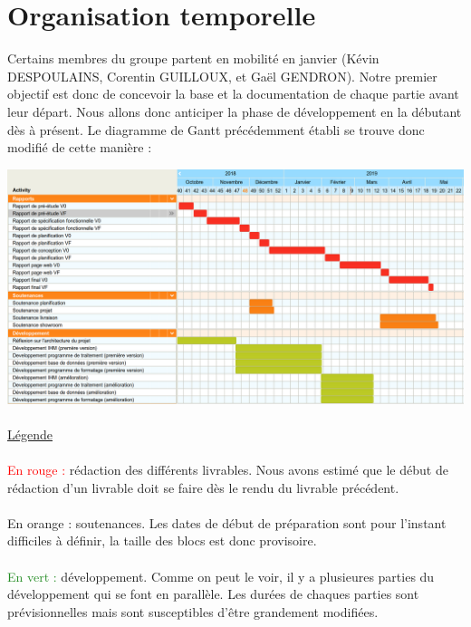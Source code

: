 \newpage

\section{Organisation temporelle}

Certains membres du groupe partent en mobilité en janvier (Kévin DESPOULAINS,
Corentin GUILLOUX, et Gaël GENDRON). Notre premier objectif est donc de
concevoir la base et la documentation de chaque partie avant leur départ.
Nous allons donc anticiper la phase de développement en la débutant dès à
présent. Le diagramme de Gantt précédemment établi se trouve donc modifié de
cette manière :

\begin{mdframed}[frametitle={Figure 17 : Estimation de la planification des tâches}, innerbottommargin=10]
\begin{center}
\includegraphics[scale=0.85]{gantt.png}
\end{center}
\end{mdframed}

\paragraph{}
\underline{Légende}

\paragraph{}
\textcolor{red}{En rouge : } rédaction des différents livrables. Nous avons estimé que le début de rédaction d’un livrable doit se faire dès le rendu du livrable précédent.

\paragraph{}
\textcolor{RedOrange}{En orange : } soutenances. Les dates de début de préparation sont pour l’instant difficiles à définir, la taille des blocs est donc provisoire.

\paragraph{}
\textcolor{ForestGreen}{En vert : } développement. Comme on peut le voir, il y a plusieures parties du développement qui se font en parallèle. Les durées de chaques parties sont prévisionnelles mais sont susceptibles d’être grandement modifiées.

